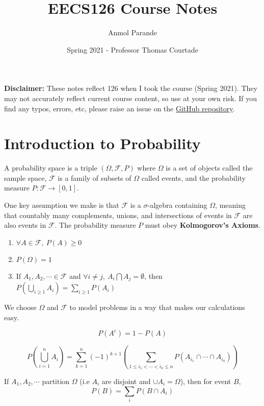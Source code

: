

\title{EECS126 Course Notes}
\author{Anmol Parande}
\date{Spring 2021 - Professor Thomas Courtade}
\maketitle
\textbf{Disclaimer: }These notes reflect 126 when I took the course (Spring 2021). They may not accurately reflect current course content, so use at your own risk.
If you find any typos, errors, etc, please raise an issue on the \href{https://github.com/parandea17/BerkeleyNotes}{GitHub repository}.
\tableofcontents
\newpage
\section{Introduction to Probability}
\begin{definition}
  A probability space is a triple $(\Omega, \mathcal{F}, P)$ where $\Omega$ is a set of objects called the sample space, $\mathcal{F}$ is a family of subsets of $\Omega$ called events, and the probability measure $P:\mathcal{F}\rightarrow [0,1]$.
  \label{defn:prob-space}
\end{definition}
One key assumption we make is that $\mathcal{F}$ is a $\sigma$-algebra containing $\Omega$, meaning that countably many complements, unions, and intersections of events in $\mathcal{F}$ are also events in $\mathcal{F}$.
The probability measure $P$ must obey \textbf{Kolmogorov's Axioms}.
\begin{enumerate}
  \item $\forall A \in \mathcal{F},\ P(A) \geq 0$
  \item $P(\Omega) = 1$
  \item If $A_1, A_2, \cdots\in \mathcal{F}$ and $\forall i\ne j,\ A_i\bigcap A_j=\emptyset$, then $P\left(\bigcup_{i\geq 1}A_i\right) = \sum_{i\geq1}P(A_i)$
\end{enumerate}
We choose $\Omega$ and $\mathcal{F}$ to model problems in a way that makes our calculations easy.
\begin{theorem}
  \[
	P(A^c) = 1 - P(A)
  \]
  \label{thm:complementarity}
\end{theorem}
\begin{theorem}
  \[
	P\left( \bigcup_{i=1}^{n}A_i \right) = \sum_{k=1}^{n}(-1)^{k+1}\left( \sum_{1\leq i_1<\cdots<i_k\leq n} P(A_{i_1}\cap \cdots \cap A_{i_k}) \right)
  \]
  \label{thm:inclusion-exclusion}
\end{theorem}
\begin{theorem}
  If $A_1, A_2, \cdots$ partition $\Omega$ (i.e $A_i$ are disjoint and $\cup A_i = \Omega$), then for event $B$,
  \[
	P(B) = \sum_iP(B\cap A_i)
  \]
  \label{thm:total-prob}
\end{theorem}
